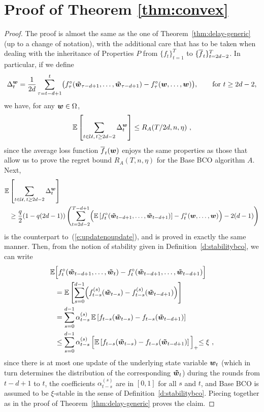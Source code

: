 \section{Proof of Theorem \ref{thm:convex}}

\begin{proof}
The proof is almost the same as the one of Theorem~\ref{thm:delay-generic} (up to a change of notation), with the additional care that has to be taken when dealing with the inheritance of Properties $P$ from $\{f_t\}_{t=1}^T$ to $\{{\overline{f}}_t\}_{t=2d-2}^T$.
%
In particular, if we define
\[
\Delta_t^{\boldsymbol{w}} = \frac{1}{2d}\sum_{\tau=t-d+1}^t \bigl(f^{\circ}_\tau(\boldsymbol{{\tilde w}}_{\tau-d+1},\dots,\boldsymbol{{\tilde w}}_{\tau-d+1}) - f^{\circ}_\tau(\boldsymbol{w},\dots,\boldsymbol{w})\bigl),\qquad {\mbox{for $t \geq 2d-2$,}}
\]
we have, for any $\boldsymbol{w} \in \Omega$,
\[
\mathbb{E}\left[\sum_{t \in \mathcal{U},\, t\geq 2d-2} \Delta_t^{\boldsymbol{w}}  \right] \leq R_A(T/2d, n ,\eta)~,
\]
since the average loss function ${\overline{f}}_t(\boldsymbol{w})$ enjoys the same properties as those that allow us to prove the regret bound $R_A(T, n ,\eta)$ for the Base BCO algorithm $A$.
%
Next,
%
\begin{align*}
\mathbb{E}&\left[\sum_{t \in \mathcal{U},\,t\geq 2d-2} \Delta_t^{\boldsymbol{w}} \right] \\
  &\geq
    \frac{q}{2}(1-q(2d-1))\left(\sum_{t=2d-2}^{T-d+1} \Bigl(\mathbb{E}\left[f^{\circ}_t(\boldsymbol{{\tilde w}}_{t-d+1},\dots,\boldsymbol{{\tilde w}}_{t-d+1})\right] - f^{\circ}_t(\boldsymbol{w},\dots,\boldsymbol{w})\Bigr) -2(d-1)\right)
\end{align*}
%
is the counterpart to~(\ref{e:updatenoupdate}), and is proved in exactly the same manner. Then, from the notion of stability given in Definition~\ref{d:stabilitybco}, we can write
%
\begin{align*}
    \mathbb{E}&\Bigl[ f^{\circ}_t(\boldsymbol{{\tilde w}}_{t-d+1},\dots,\boldsymbol{{\tilde w}}_t) - f^{\circ}_t(\boldsymbol{{\tilde w}}_{t-d+1},\dots,\boldsymbol{{\tilde w}}_{t-d+1}) \Bigr]
\\&=
    \mathbb{E}\left[ \sum_{s=0}^{d-1} \Bigl( f_{t-s}^{(s)}(\boldsymbol{{\tilde w}}_{t-s}) - f_{t-s}^{(s)}(\boldsymbol{{\tilde w}}_{t-d+1})   \Bigr)\right]\\
&=
    \sum_{s=0}^{d-1}\alpha_{t-s}^{(s)}\,\mathbb{E}\left[ f_{t-s}(\boldsymbol{{\tilde w}}_{t-s}) - f_{t-s}(\boldsymbol{{\tilde w}}_{t-d+1})\right]\\
&\leq
    \sum_{s=0}^{d-1}\alpha_{t-s}^{(s)}\,\Bigl[\mathbb{E}\left[ f_{t-s}(\boldsymbol{{\tilde w}}_{t-s}) - f_{t-s}(\boldsymbol{{\tilde w}}_{t-d+1})\right]\Bigl]_+
\leq
    \xi~,
\end{align*}
since there is at most one update of the underlying state variable $\boldsymbol{w}_t$ (which in turn determines the distribution of the corresponding $\boldsymbol{{\tilde w}}_t$)
during the rounds from $t-d+1$ to $t$, the coefficients $\alpha_{t-s}^{(s)}$ are in $[0,1]$ for all $s$ and $t$, and Base BCO is assumed to be $\xi$-stable in
the sense of Definition~\ref{d:stabilitybco}.
%
Piecing together as in the proof of Theorem~\ref{thm:delay-generic} proves the claim.
\end{proof}





